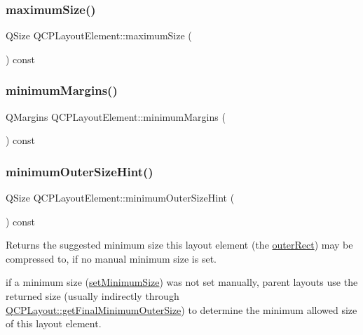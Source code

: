 \subsubsection{\texorpdfstring{maximumSize()}{maximumSize()}}
{\footnotesize\ttfamily Q\+Size Q\+C\+P\+Layout\+Element\+::maximum\+Size (\begin{DoxyParamCaption}{ }\end{DoxyParamCaption}) const\hspace{0.3cm}{\ttfamily [inline]}}

\mbox{\label{class_q_c_p_layout_element_a5eae30e28f28d73fd1c56409c011393e}} 
\subsubsection{\texorpdfstring{minimumMargins()}{minimumMargins()}}
{\footnotesize\ttfamily Q\+Margins Q\+C\+P\+Layout\+Element\+::minimum\+Margins (\begin{DoxyParamCaption}{ }\end{DoxyParamCaption}) const\hspace{0.3cm}{\ttfamily [inline]}}

\mbox{\label{class_q_c_p_layout_element_a46789036c4fcb190fa374f91321d7c09}} 
\subsubsection{\texorpdfstring{minimumOuterSizeHint()}{minimumOuterSizeHint()}}
{\footnotesize\ttfamily Q\+Size Q\+C\+P\+Layout\+Element\+::minimum\+Outer\+Size\+Hint (\begin{DoxyParamCaption}{ }\end{DoxyParamCaption}) const\hspace{0.3cm}{\ttfamily [virtual]}}

Returns the suggested minimum size this layout element (the \mbox{\hyperlink{class_q_c_p_layout_element_a2a32a12a6161c9dffbadeb9cc585510c}{outer\+Rect}}) may be compressed to, if no manual minimum size is set.

if a minimum size (\mbox{\hyperlink{class_q_c_p_layout_element_a5dd29a3c8bc88440c97c06b67be7886b}{set\+Minimum\+Size}}) was not set manually, parent layouts use the returned size (usually indirectly through \mbox{\hyperlink{class_q_c_p_layout_a864fddc84721f186663faf3683f1fa70}{Q\+C\+P\+Layout\+::get\+Final\+Minimum\+Outer\+Size}}) to determine the minimum allowed size of this layout element.

